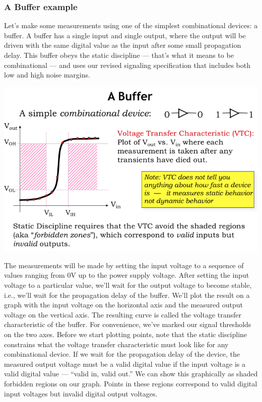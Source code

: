 \documentclass[a4paper,twoside]{article}
\numberwithin{equation}{section}
\begin{document}
\subsubsection{A Buffer example}
Let's make some measurements using one of the simplest combinational devices: a buffer. A buffer has a single
input and single output, where the output will be driven with the same digital value as the input after
some small propagation delay. This buffer obeys the static discipline — that's what it means to be
combinational — and uses our revised signaling specification that includes both low and high noise margins.
\begin{center}
    \includegraphics[scale = 0.3]{assets/buffer.png}
\end{center}
The measurements will be made by setting the input voltage to a sequence of values ranging from 0V up to
the power supply voltage. After setting the input voltage to a particular value, we'll wait for the output
voltage to become stable, i.e., we'll wait for the propagation delay of the buffer. We'll plot the result
on a graph with the input voltage on the horizontal axis and the measured output voltage on the vertical axis.
The resulting curve is called the voltage transfer characteristic of the buffer. For convenience, we've marked
our signal thresholds on the two axes.
Before we start plotting points, note that the static discipline constrains what the voltage transfer
characteristic must look like for any combinational device. If we wait for the propagation delay of the
device, the measured output voltage must be a valid digital value if the input voltage is a valid digital
value — “valid in, valid out.” We can show this graphically as shaded forbidden regions on our graph.
Points in these regions correspond to valid digital input voltages but invalid digital output voltages.
\end{document}
